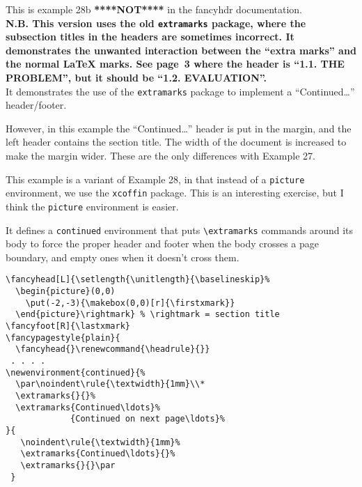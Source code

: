 \documentclass{report}
\begin{document}
\tableofcontents

\thispagestyle{plain}
\noindent
\begin{boxedminipage}{\textwidth}
This is example 28b \textbf{****NOT****} in the fancyhdr documentation.
\\[1ex]
\textbf{N.B. This version uses the old \texttt{extramarks} package, where the subsection titles in the headers are sometimes incorrect. It demonstrates the unwanted interaction between the ``extra marks'' and the normal \LaTeX{} marks. See page~3 where the header is ``1.1. THE PROBLEM'', but it should be ``1.2. EVALUATION''.}
\\[1ex]
It demonstrates the use of the \texttt{extramarks} package to implement
a ``Continued\ldots'' header/footer.

However, in this example the ``Continued\ldots'' header is put in the margin, and the left header contains the section title. The width of the document is increased to make the margin wider. These are the only differences with Example 27.

This example is a variant of Example 28, in that instead of a \texttt{picture} environment, we use the \texttt{xcoffin} package. This is an interesting exercise, but I think the \texttt{picture} environment is easier.

It defines a \texttt{continued} environment that puts \verb|\extramarks| commands around its body to force the proper header and footer when the body crosses a page boundary, and empty ones when it doesn't cross them.

\begin{verbatim}
\fancyhead[L]{\setlength{\unitlength}{\baselineskip}%
  \begin{picture}(0,0)
    \put(-2,-3){\makebox(0,0)[r]{\firstxmark}}
  \end{picture}\rightmark} % \rightmark = section title
\fancyfoot[R]{\lastxmark}
\fancypagestyle{plain}{
  \fancyhead{}\renewcommand{\headrule}{}}
 . . . .
\newenvironment{continued}{%
  \par\noindent\rule{\textwidth}{1mm}\\*
  \extramarks{}{}%
  \extramarks{Continued\ldots}%
             {Continued on next page\ldots}%
}{
   \noindent\rule{\textwidth}{1mm}%
   \extramarks{Continued\ldots}{}%
   \extramarks{}{}\par
 }
\end{verbatim}

\end{boxedminipage}
\end{document}
